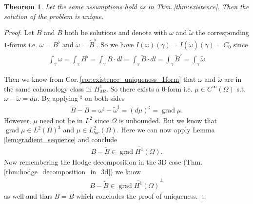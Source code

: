\documentclass[12pt,a4paper]{article}
\numberwithin{equation}{subsection}
\numberwithin{lemma}{subsection}
\newtheorem{theorem}[lemma]{Theorem}
\theoremstyle{definition}
\DeclareMathOperator{\grad}{grad}
\newcommand{\rop}{\mathscr{R}} %
\begin{document}
\begin{theorem}
    Let the same assumptions hold as in Thm.\,\ref{thm:existence}.
    Then the solution of the problem is unique.
\end{theorem}

\begin{proof}
    Let $B$ and $\tilde{B}$ both be solutions and denote with $\omega$ 
    and $\tilde{\omega}$ the corresponding $1$-forms i.e. $\omega =
    B^\flat$ and $\tilde{\omega} = \tilde{B}^\flat$. 
    So we have $I(\omega)(\gamma) = I(\tilde{\omega})(\gamma) = C_0$
    since 
    \begin{align*}
        \int_\gamma \omega = \int_\gamma B^\flat = 
        \int_\gamma B \cdot dl = \int_\gamma \tilde{B}\cdot dl 
        = \int_\gamma \tilde{B}^\flat = \int_\gamma \tilde{\omega}
    \end{align*}

    Then we know from Cor.\,\ref{cor:existence_uniqueness_1form} 
    that $\omega$ and $\tilde{\omega}$ are in the 
    same cohomology class in $H^1_{dR}$. So there exists a $0$-form i.e. 
    $\mu \in C^\infty(\Omega)$ s.t. $\omega - \tilde{\omega} = d\mu$.
    By applying $^\sharp$ on both sides
    \begin{align*}
        B - \tilde{B} 
        = \omega^\sharp - \tilde{\omega}^\sharp
        = (d\mu)^\sharp = \grad \mu.
    \end{align*}
    However, $\mu$ need not be in $L^2$ since $\Omega$ is unbounded.
    But we know that $\grad \mu \in L^2(\Omega)^3$ and 
    $\mu \in L^2_{loc}(\Omega)$. 
    Here we can now apply Lemma \ref{lem:gradient_sequence} and conclude
    \begin{align*}
        B - \tilde{B} \in \overline{\grad H^1(\Omega)}.
    \end{align*}
    Now remembering the Hodge decomposition in the 3D case (Thm.\,\ref{thm:hodge_decomposition_in_3d}) we know 
    \begin{align*}
        B - \tilde{B} \in \overline{\grad H^1(\Omega)}^\perp
    \end{align*}
    as well and thus $B = \tilde{B}$ which concludes the proof of uniqueness.
\end{proof}


    
\end{document}

